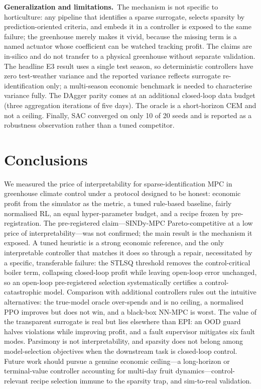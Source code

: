 \documentclass[preprint,3p]{elsarticle}
\begin{document}
\textbf{Generalization and limitations.}~The mechanism is not specific to horticulture: any
pipeline that identifies a sparse surrogate, selects sparsity by prediction-oriented criteria,
and embeds it in a controller is exposed to the same failure; the greenhouse merely makes it
vivid, because the missing term is a named actuator whose coefficient can be watched tracking
profit. The claims are in-silico and do not transfer to a physical greenhouse without separate
validation. The headline E3 result uses a single test season, so deterministic controllers have
zero test-weather variance and the reported variance reflects surrogate re-identification only;
a multi-season economic benchmark is needed to characterise variance fully. The DAgger parity
comes at an additional closed-loop data budget (three aggregation iterations of five days). The
oracle is a short-horizon CEM and not a ceiling. Finally, SAC converged on only 10 of 20 seeds
and is reported as a robustness observation rather than a tuned competitor.

\section{Conclusions}
\label{sec:conclusions}

We measured the price of interpretability for sparse-identification MPC in greenhouse climate
control under a protocol designed to be honest: economic profit from the simulator as the
metric, a tuned rule-based baseline, fairly normalised RL, an equal hyper-parameter budget, and
a recipe frozen by pre-registration. The pre-registered claim---SINDy-MPC Pareto-competitive at
a low price of interpretability---was not confirmed; the main result is the mechanism it exposed.
A tuned heuristic is a strong economic reference, and the only interpretable controller that
matches it does so through a repair, necessitated by a specific, transferable failure: the STLSQ
threshold removes the control-critical boiler term, collapsing closed-loop profit while leaving
open-loop error unchanged, so an open-loop pre-registered selection systematically certifies a
control-catastrophic model. Comparison with additional controllers rules out the intuitive
alternatives: the true-model oracle over-spends and is no ceiling, a normalised PPO improves but
does not win, and a black-box NN-MPC is worst. The value of the transparent surrogate is real but
lies elsewhere than EPI: an OOD guard halves violations while improving profit, and a fault
supervisor mitigates six fault modes. Parsimony is not interpretability, and sparsity does not
belong among model-selection objectives when the downstream task is closed-loop control. Future
work should pursue a genuine economic ceiling---a long-horizon or terminal-value controller
accounting for multi-day fruit dynamics---control-relevant recipe selection immune to the
sparsity trap, and sim-to-real validation.
\end{document}
